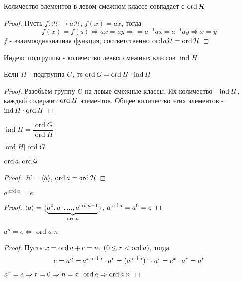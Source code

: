 \documentclass[../main/document.tex]{subfiles}
\begin{document}
\begin{cnsq}
Количество элементов в левом смежном классе совпадает с $\operatorname{ord} \mathcal{H}$
\begin{proof}
Пусть $f:\mathcal{H}\rightarrow a\mathcal{H}$, $f(x)=ax$, тогда
$$f(x)=f(y)\Rightarrow ax=ay\Rightarrow=a^{-1}ax=a^{-1}ay\Rightarrow x=y$$
$f$ - взаимоодназначная функция, соответственно $\operatorname{ord} a\mathcal{H}=\operatorname{ord} \mathcal{H}$
\end{proof}
\end{cnsq}

\begin{dfn}
Индекс подгруппы - количество левых смежных классов $\operatorname{ind}H$
\end{dfn}

\begin{thm}
Если $H$ - подгруппа $G$, то $\operatorname{ord}G=\operatorname{ord}H\cdot \operatorname{ind} H$
\begin{proof}
Разобьём группу $G$ на левые смежные классы. Их количество - $\operatorname{ind} H$, каждый содержит $\operatorname{ord} H$ элементов. Общее количество этих элементов - $\operatorname{ind} H\cdot \operatorname{ord} H$

\end{proof}
\end{thm}
\begin{cnsq}
$\operatorname{ind}H=\dfrac{\operatorname{ord}G}{\operatorname{ord}H}$
\end{cnsq}

\begin{cnsq}
$\operatorname{ord}H|\operatorname{ord}G$
\end{cnsq}

\begin{cnsq}
$\operatorname{ord} a| \operatorname{ord} \mathcal{G}$
\begin{proof}
$\mathcal{H}=\langle a\rangle$, $\operatorname{ord} a= \operatorname{ord} \mathcal{H}$

\end{proof}
\end{cnsq}

\begin{thm}
$a^{\operatorname{ord}a}=e$
\begin{proof}
$\langle a\rangle=\{\underbrace{a^0,a^1,...,a^{\operatorname{ord} a-1}}_{\operatorname{ord} a}\}$, $a^{\operatorname{ord} a}=a^0=e$

\end{proof}
\end{thm}


\begin{thm}
$a^{n}=e\Leftrightarrow \operatorname{ord}a|n$
\begin{proof}
Пусть $x=\operatorname{ord} a +r=n$, $(0\leq r< \operatorname{ord} a)$, тогда
$$e=a^n=a^{x\operatorname{ord} a}\cdot a^r=(a^{\operatorname{ord} a})^x\cdot a^r=e^x\cdot a^r=a^r$$
$a^r=e\Rightarrow r=0 \Rightarrow n=x\cdot \operatorname{ord} a\Rightarrow \operatorname{ord} a|n$

\end{proof}
\end{thm}
\end{document}
